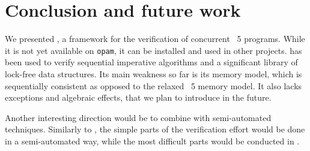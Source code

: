 \section{Conclusion and future work}

We presented \Zoo, a framework for the verification of concurrent \OCaml~5 programs.
While it is not yet available on \texttt{opam}, it can be installed and used in other \Rocq projects.
%
\Zoo has been used to verify sequential imperative algorithms and a significant library of lock-free data structures.
Its main weakness so far is its memory model, which is sequentially consistent as opposed to the relaxed \OCaml~5 memory model.
It also lacks exceptions and algebraic effects, that we plan to introduce in the future.

Another interesting direction would be to combine \Zoo with semi-automated techniques.
Similarly to \WhyThree, the simple parts of the verification effort would be done in a semi-automated way, while the most difficult parts would be conducted in \Rocq.

